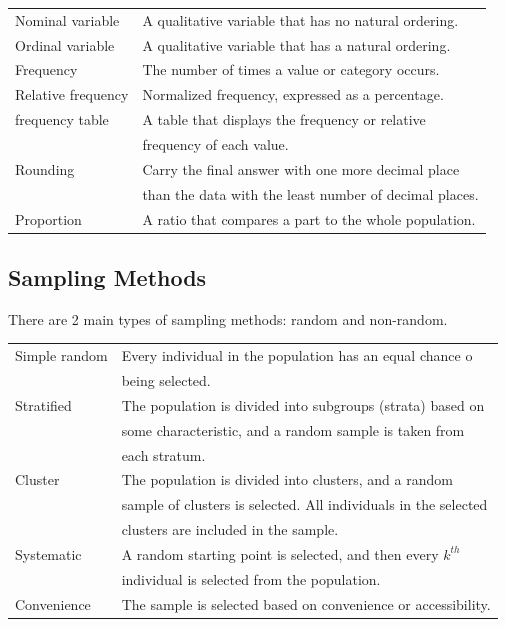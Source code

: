 \documentclass[5pt]{article}
\begin{document}
\begin{multicols}{2}
\begin{tabular}{L L}
    Nominal variable & A qualitative variable that has no natural ordering.\\
    Ordinal variable & A qualitative variable that has a natural ordering.\\
    Frequency & The number of times a value or category occurs.\\
    Relative frequency & Normalized frequency, expressed as a percentage.\\
    frequency table & A table that displays the frequency or relative\\
                     & frequency of each value.\\
    Rounding & Carry the final answer with one more decimal place\\
             & than the data with the least number of decimal places.\\
    Proportion & A ratio that compares a part to the whole population.\\
\end{tabular}

\subsection{Sampling Methods}
There are 2 main types of sampling methods: random and non-random.\\
\begin{tabular}{LL}
  Simple random & Every individual in the population has an equal chance o\\
                & being selected.\\
  Stratified & The population is divided into subgroups (strata) based on\\
            & some characteristic, and a random sample is taken from\\
            & each stratum.\\
  Cluster & The population is divided into clusters, and a random\\
          & sample of clusters is selected. All individuals in the selected\\
          & clusters are included in the sample.\\
  Systematic & A random starting point is selected, and then every $k^{th}$\\
             & individual is selected from the population.\\
  Convenience & The sample is selected based on convenience or accessibility.\\
\end{tabular}


\end{multicols}
\end{document}
